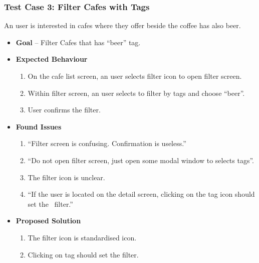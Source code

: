 \subsubsection{Test Case 3: Filter Cafes with Tags}
An user is interested in cafes where they offer beside the coffee has also beer.
\begin{itemize}
    \item \textbf{Goal} -- Filter Cafes that has ``beer'' tag.
    \item \textbf{Expected Behaviour}
    \begin{enumerate}
        \item On the cafe list screen, an user selects filter icon to open filter screen.
        \item Within filter screen, an user selects to filter by tags and choose ``beer''.
        \item User confirms the filter. 
    \end{enumerate}
    \item \textbf{Found Issues}
    \begin{enumerate}
        \item ``Filter screen is confusing. Confirmation is useless.''
        \item ``Do not open filter screen, just open some modal window to selects tags''.
        \item The filter icon is unclear.
        \item ``If the user is located on the detail screen, clicking on the tag icon should set the~ filter.'' 
    \end{enumerate}
    \item \textbf{Proposed Solution}
    \begin{enumerate}
        \item The filter icon is standardised icon. 
        \item Clicking on tag should set the filter. 
    \end{enumerate}
\end{itemize}
